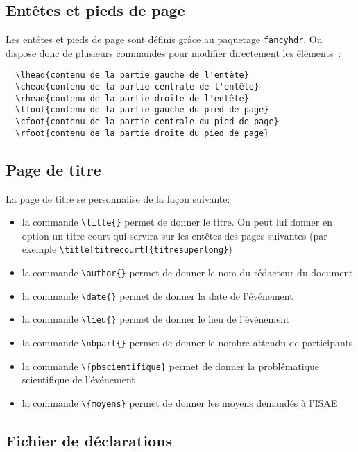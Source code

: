 \documentclass[french]{supaero-orga}
\begin{document}
\subsection{Entêtes et pieds de page}
\label{sec:entetes-et-pieds}

Les entêtes et pieds de page sont définis grâce au paquetage
\texttt{fancyhdr}. On dispose donc de plusieurs commandes pour
modifier directement les éléments~:

\begin{verbatim}
  \lhead{contenu de la partie gauche de l'entête}
  \chead{contenu de la partie centrale de l'entête}
  \rhead{contenu de la partie droite de l'entête}
  \lfoot{contenu de la partie gauche du pied de page}
  \cfoot{contenu de la partie centrale du pied de page}
  \rfoot{contenu de la partie droite du pied de page}
\end{verbatim}

\subsection{Page de titre}
\label{sec:page-de-titre}

La page de titre se personnalise de la façon suivante:

\begin{itemize}
\item la commande \verb!\title{}! permet de donner le titre. On peut
  lui donner en option un titre court qui servira sur les entêtes des
  pages suivantes (par exemple
  \verb!\title[titrecourt]{titresuperlong}!)
\item la commande \verb!\author{}! permet de donner le nom du
  rédacteur du document
\item la commande \verb!\date{}! permet de donner la date de
  l'événement
\item la commande \verb!\lieu{}! permet de donner le lieu de
l'événement
\item la commande \verb!\nbpart{}! permet de donner le nombre attendu
  de participants
\item la commande \verb!\{pbscientifique}! permet de donner la
problématique scientifique de l'événement
\item la commande \verb!\{moyens}! permet de donner les moyens
demandés à l'ISAE
\end{itemize}

\subsection{Fichier de déclarations}
\label{sec:fich-de-decl}
\end{document}
